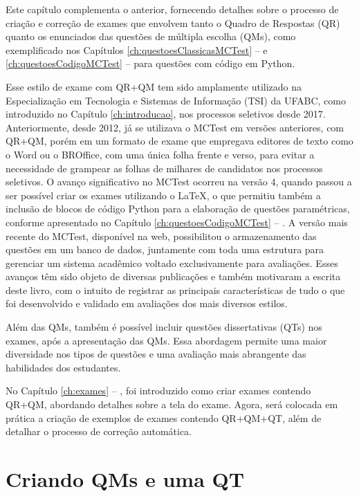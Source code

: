 \label{ch:examesQM_QT}

Este capítulo complementa o anterior, fornecendo detalhes sobre o processo de criação e correção de exames que envolvem tanto o Quadro de Respostas (QR) quanto os enunciados das questões de múltipla escolha (QMs), como exemplificado nos Capítulos \ref{ch:questoesClassicasMCTest} --  e  \ref{ch:questoesCodigoMCTest} --  para questões com código em Python.

Esse estilo de exame com QR+QM tem sido amplamente utilizado na Especialização em Tecnologia e Sistemas de Informação (TSI) da UFABC, como introduzido no Capítulo \ref{ch:introducao}, nos processos seletivos desde 2017. Anteriormente, desde 2012, já se utilizava o MCTest em versões anteriores, com QR+QM, porém em um formato de exame que empregava editores de texto como o Word ou o BROffice, com uma única folha frente e verso, para evitar a necessidade de grampear as folhas de milhares de candidatos nos processos seletivos. O avanço significativo no MCTest ocorreu na versão 4, quando passou a ser possível criar os exames utilizando o \LaTeX{}, o que permitiu também a inclusão de blocos de código Python para a elaboração de questões paramétricas, conforme apresentado no Capítulo \ref{ch:questoesCodigoMCTest} -- . A versão mais recente do MCTest, disponível na web, possibilitou o armazenamento das questões em um banco de dados, juntamente com toda uma estrutura para gerenciar um sistema acadêmico voltado exclusivamente para avaliações. Esses avanços têm sido objeto de diversas publicações e também motivaram a escrita deste livro, com o intuito de registrar as principais características de tudo o que foi desenvolvido e validado em avaliações dos mais diversos estilos.

Além das QMs, também é possível incluir questões dissertativas (QTs) nos exames, após a apresentação das QMs. Essa abordagem permite uma maior diversidade nos tipos de questões e uma avaliação mais abrangente das habilidades dos estudantes.

No Capítulo \ref{ch:exames} -- , foi introduzido como criar exames contendo QR+QM, abordando detalhes sobre a tela do exame. Agora, será colocada em prática a criação de exemplos de exames contendo QR+QM+QT, além de detalhar o processo de correção automática.

\section{Criando QMs e uma QT}\label{sec:questoesQM_QT}


